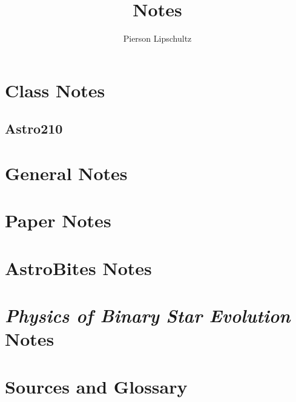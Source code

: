 \documentclass{report}
\title{Notes}
\author{Pierson Lipschultz}
\theoremstyle{mytheoremstyle}
\theoremstyle{mytheoremstyle}
\theoremstyle{myproblemstyle}
\theoremstyle{myproblemstyle}
\begin{document}
    \pagestyle{fancy}

    \fancyhf{}
    \fancyfoot[L]{\nouppercase{\leftmark}} %
    \fancyfoot[R]{\thepage}                               %

    \renewcommand{\headrulewidth}{0pt}
    \renewcommand{\footrulewidth}{1pt}
    \renewcommand{\sectionmark}[1]{\markboth{#1}{}}

    \tableofcontents

\pagebreak

\part{Class Notes}
\chapter{Astro210}


\clearpage
{}
\part{General Notes}


\clearpage
{}
\part{Paper Notes}
\newcommand{\AnMainDocument}{}


\clearpage
{}
\part{AstroBites Notes}


\clearpage
{}
\part{\textit{Physics of Binary Star Evolution} Notes \cite{TaurisvandenHeuvel+2023}}


\clearpage
{}
\part{Sources and Glossary}

\printbibliography[
heading=bibintoc,
title={\centering Sources}
]

\printglossaries
\end{document}
